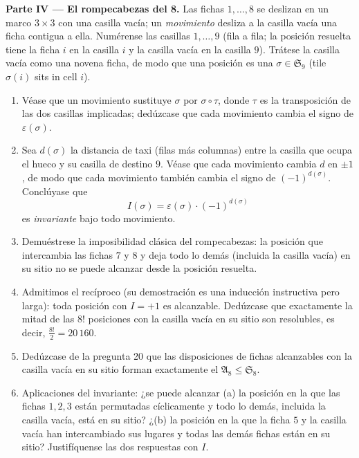 \begin{problem}
\medskip
\noindent\textbf{Parte IV --- El rompecabezas del 8.} Las fichas
$1, \dots, 8$ se deslizan en un marco $3 \times 3$ con una casilla
vacía; un \emph{movimiento} desliza a la casilla vacía una ficha
contigua a ella. Numérense las casillas $1, \dots, 9$ (fila a fila; la
posición resuelta tiene la ficha $i$ en la casilla $i$ y la casilla
vacía en la casilla $9$). Trátese la casilla vacía como una novena
ficha, de modo que una posición es una  $\sigma \in \mathfrak
S_9$ (tile $\sigma(i)$ sits in cell $i$).
\begin{enumerate}[resume]
  \item Véase que un movimiento sustituye $\sigma$ por
        $\sigma \circ \tau$, donde $\tau$ es la transposición de las
        dos casillas implicadas; dedúzcase que cada movimiento cambia
        el signo de
        $\varepsilon(\sigma)$.
  \item Sea $d(\sigma)$ la distancia de taxi (filas más columnas)
        entre la casilla que ocupa el hueco y su casilla de destino
        $9$. Véase que cada movimiento cambia $d$ en $\pm1$, de modo
        que cada movimiento también cambia el signo de
        $(-1)^{d(\sigma)}$. Conclúyase que
        \[
        I(\sigma) = \varepsilon(\sigma)\cdot(-1)^{d(\sigma)}
        \]
        es \emph{invariante} bajo todo movimiento.
  \item Demuéstrese la imposibilidad clásica del rompecabezas: la
        posición que intercambia las fichas $7$ y $8$ y deja todo lo
        demás (incluida la casilla vacía) en su sitio no se puede
        alcanzar desde la posición resuelta.
  \item Admitimos el recíproco (su demostración es una inducción
        instructiva pero larga): toda posición con $I = +1$ es
        alcanzable. Dedúzcase que exactamente la mitad de las $8!$
        posiciones con la casilla vacía en su sitio son resolubles, es
        decir,
        $\frac{8!}2 = 20\,160$.
  \item Dedúzcase de la pregunta 20 que las disposiciones de fichas
        alcanzables con la casilla vacía en su sitio forman exactamente
        el  $\mathfrak A_8 \leq \mathfrak S_8$.
  \item Aplicaciones del invariante: ¿se puede alcanzar (a) la posición
        en la que las fichas $1, 2, 3$ están permutadas cíclicamente y
        todo lo demás, incluida la casilla vacía, está en su sitio?
        ¿(b) la posición en la que la ficha $5$ y la casilla vacía han
        intercambiado sus lugares y todas las demás fichas están en su
        sitio? Justifíquense las dos respuestas con $I$.
\end{enumerate}


\end{problem}
